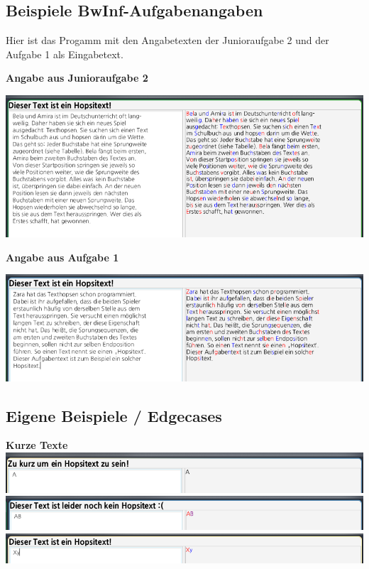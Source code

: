 \documentclass[a4paper,10pt,ngerman]{scrartcl}
\begin{document}
\subsection{Beispiele BwInf-Aufgabenangaben}
Hier ist das Progamm mit den Angabetexten der Junioraufgabe 2 und der Aufgabe 1 als Eingabetext.
\newline

\textbf{Angabe aus Junioraufgabe 2}
\newline

\includegraphics[scale=0.55]{junioraufgabe2-eingabe.png}
\newline

\textbf{Angabe aus Aufgabe 1}
\newline

\includegraphics[scale=0.55]{aufgabe1-angabe.png}

\subsection{Eigene Beispiele / Edgecases}

\textbf{Kurze Texte}
\newline
\newline
\includegraphics[scale=0.55]{kurz1.png}
\newline
\includegraphics[scale=0.55]{kurz2.png}
\newline
\includegraphics[scale=0.55]{kurz3.png}
\end{document}
